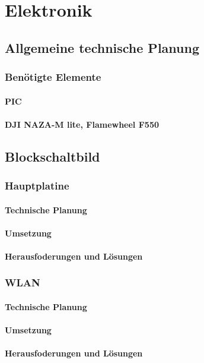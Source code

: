 \chapter{Elektronik}
\renewcommand{\kapitelautor}{Autor: Lucas Ullrich}

\section{Allgemeine technische Planung}

  \subsection{Benötigte Elemente}

    \subsubsection{PIC}

    \subsubsection{DJI NAZA-M lite, Flamewheel F550}

\section{Blockschaltbild}

  \subsection{Hauptplatine}

    \subsubsection{Technische Planung}

    \subsubsection{Umsetzung}

    \subsubsection{Herausfoderungen und Lösungen}

  \subsection{WLAN}

    \subsubsection{Technische Planung}

    \subsubsection{Umsetzung}

    \subsubsection{Herausfoderungen und Lösungen}
